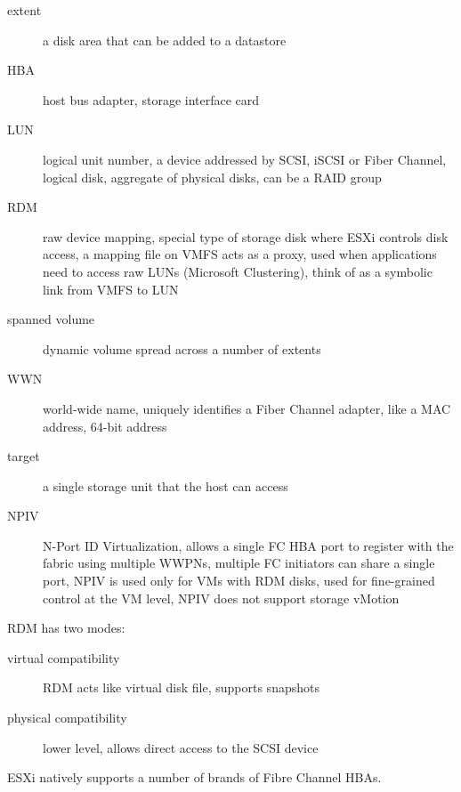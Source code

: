 \begin{description}

  \item[extent] a disk area that can be added to a datastore

  \item[HBA] host bus adapter, storage interface card

  \item [LUN] logical unit number, a device addressed by SCSI, iSCSI or Fiber
    Channel, logical disk, aggregate of physical disks, can be a RAID group

  \item[RDM] raw device mapping, special type of storage disk where ESXi
    controls disk access, a mapping file on VMFS acts as a proxy, used when
    applications need to access raw LUNs (Microsoft Clustering), think of
    as a symbolic link from VMFS to LUN

  \item[spanned volume]
    dynamic volume spread across a number of extents

  \item[WWN] world-wide name, uniquely identifies a Fiber Channel adapter,
    like a MAC address, 64-bit address

  \item[target] a single storage unit that the host can access

  \item[NPIV]
    N-Port ID Virtualization, allows a single FC HBA port to register with the
    fabric using multiple WWPNs, multiple FC initiators can share a single port,
    NPIV is used only for VMs with RDM disks, used for fine-grained control
    at the VM level, NPIV does not support storage vMotion

\end{description}

RDM has two modes:

\begin{description}

\item[virtual compatibility]
RDM acts like virtual disk file, supports snapshots

\item[physical compatibility]
lower level, allows direct access to the SCSI device
 
\end{description}

ESXi natively supports a number of brands of Fibre Channel HBAs.

